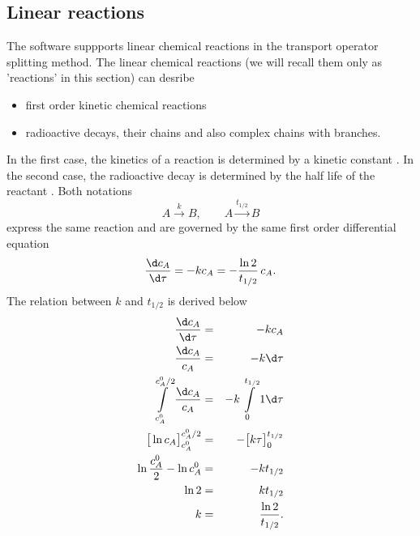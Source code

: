 %
%
%
%

\normalsize

\subsection{Linear reactions}
\label{sec:linear_reactions}
The software suppports linear chemical reactions in the transport operator splitting method. 
The linear chemical reactions (we will recall them only as 'reactions' in this section) can desribe
\begin{itemize}
  \item first order kinetic chemical reactions
  \item radioactive decays, their chains and also complex chains with branches.
\end{itemize}
In the first case, the kinetics of a reaction is determined by a kinetic constant . 
In the second case, the radioactive decay is determined by the half life of the reactant 
. Both notations
%
\[ A\xrightarrow{k} B, \qquad A\xrightarrow{t_{1/2}} B \]
%
express the same reaction and are governed by the same first order differential equation 
%
\[ \frac{\d c_A}{\d\tau} = -kc_A = - \frac{\ln 2}{t_{1/2}}\, c_A. \]
%
The relation between $k$ and $t_{1/2}$ is derived below
\begin{eqnarray*}
    \frac{\d c_A}{\d\tau} &=& -k c_A\\
    \frac{\d c_A}{c_A} &=& -k \d\tau\\
    \int\limits_{c_A^0}^{c_A^0/2}\frac{\d c_A}{c_A} &=& -k\int\limits_{0}^{t_{1/2}} 1\d\tau\\
    \big[ \ln c_A\big]^{c_A^0/2}_{c_A^0} &=& -\big[k\tau\big]^{t_{1/2}}_{0}\\
    \ln\frac{c_A^0}{2} - \ln c_A^0 &=& - k t_{1/2}\\
    \ln 2 &=& k t_{1/2}\\
    k &=& \frac{\ln 2}{t_{1/2}}.
\end{eqnarray*}



